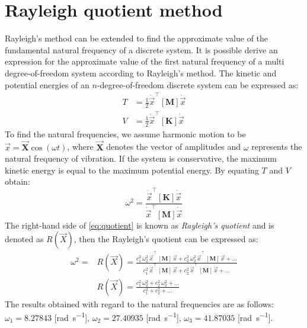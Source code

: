 \section{Rayleigh quotient method}
\label{sec:ray}
Rayleigh's method can be extended to find the approximate value of the fundamental
natural frequency of a discrete system.
It is possible derive an expression for the approximate value of the first
natural frequency of a multi degree-of-freedom system according to Rayleigh's
method.
The kinetic and potential energies of an \(n\)-degree-of-freedom discrete system
can be expressed as:
\begin{align}\label{eq:energyequation}
  T &= \frac{1}{2}\dot{\vec{x}}^{\top}[\mathbf{M}]\dot{\vec{x}}\\[1em]
  V &= \frac{1}{2}\dot{\vec{x}}^{\top}[\mathbf{K}]\dot{\vec{x}}
\end{align}
To find the natural frequencies, we assume harmonic motion to be
\(\vec{x} = \vec{\mathbf{X}} \cos(\omega t)\), where \(\vec{\mathbf{X}}\) 
denotes the vector of amplitudes and \(\omega\) represents the natural frequency
of vibration.
If the system is conservative, the maximum kinetic energy is equal to the
maximum potential energy. By equating \(T\) and \(V\) obtain:
\begin{equation}\label{eq:quotient}
  \omega^2 = \frac{\dot{\vec{x}}^{\top}[\mathbf{K}]\dot{\vec{x}}}
  {\dot{\vec{x}}^{\top}[\mathbf{M}]\dot{\vec{x}}}
\end{equation}
%
The right-hand side of \eqref{eq:quotient} is known as \emph{Rayleigh's quotient}
and is denoted as \(R(\vec{X})\), then the Rayleigh's quotient can be expressed
as:
\begin{align}
  \omega^{2} =& R(\vec{X}) =
  \frac{
          c_{1}^{2}\,\omega_{2}^{2}\,\dot{\vec{x}}^{\top}\,[\mathbf{M}]\,\dot{\vec{x}} +
          c_{2}^{2}\,\omega_{2}^{2}\,\dot{\vec{x}}^{\top}\,[\mathbf{M}]\,\dot{\vec{x}} +
          \dots}
       {
          c_{1}^{2}\,\dot{\vec{x}}^{\top}\,[\mathbf{M}]\,\dot{\vec{x}} +
          c_{2}^{2}\,\dot{\vec{x}}^{\top}\,[\mathbf{M}]\,\dot{\vec{x}} + \dots
        }\\[1.5em]
      &  R(\vec{X}) =
      \frac{c_{1}^{2}\,\omega_{2}^{2} + c_{2}^{2}\,\omega_{2}^{2} + \dots}
           {c_{1}^{2} + c_{2}^{2} + \dots}
\end{align}
The results obtained with regard to the natural frequencies are as follows:
\(\omega_{1} = 8.27843\) [\si{\radian\per\second}],
\(\omega_{2} = 27.40935\) [\si{\radian\per\second}],
\(\omega_{3} = 41.87035\) [\si{\radian\per\second}].
